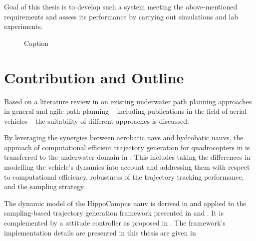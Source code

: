 Goal of this thesis is to develop such a system meeting the above-mentioned requirements and assess its performance by carrying out simulations and lab experiments.

\begin{figure}
    \centering
    
    \caption{Caption}
    \label{fig:my_label}
\end{figure}


\section{Contribution and Outline}

Based on a literature review in  on existing underwater path planning approaches in general and agile path planning -- including publications in the field of aerial vehicles -- the suitability of different approaches is discussed. 

By leveraging the synergies between aerobatic \acp{uav} and hydrobatic \acp{uauv}, the approach of computational efficient trajectory generation for quadrocopters in \cite{MuellerHehn15} is transferred to the underwater domain in .
This includes taking the differences in modelling the vehicle's dynamics into account and addressing them with respect to computational efficiency, robustness of the trajectory tracking performance, and the sampling strategy.

The dynamic model of the HippoCampus \ac{uauv} is derived in  and applied to the sampling-based trajectory generation framework presented in  and .
It is complemented by a attitude controller as proposed in .
The framework's implementation details are presented in this thesis are given in 



